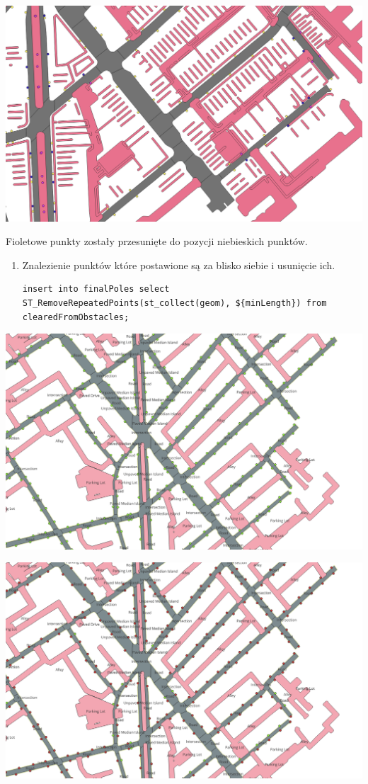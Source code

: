 \documentclass[11pt]{article}
\begin{document}
\begin{center}
\includegraphics[width=.9\linewidth]{./img/7.png}
\end{center}

Fioletowe punkty zostały przesunięte do pozycji niebieskich punktów.

\begin{enumerate}
\item Znalezienie punktów które postawione są za blisko siebie i usunięcie ich.

\begin{verbatim}
insert into finalPoles select ST_RemoveRepeatedPoints(st_collect(geom), ${minLength}) from clearedFromObstacles;
\end{verbatim}
\end{enumerate}

\begin{center}
\includegraphics[width=.9\linewidth]{./img/8.png}
\end{center}

\begin{center}
\includegraphics[width=.9\linewidth]{./img/9.png}
\end{center}
\end{document}
